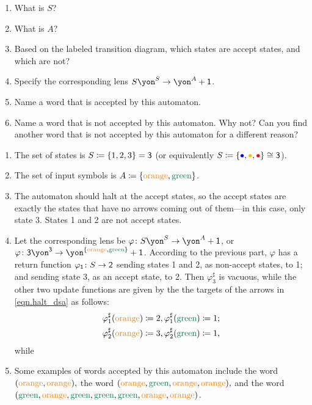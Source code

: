 \documentclass[Book-Poly]{subfiles}
\begin{document}
\begin{exercise}
\begin{enumerate}
	\item What is $S$?
	\item What is $A$?
	\item Based on the labeled transition diagram, which states are accept states, and which are not?
	\item Specify the corresponding lens $S\yon^S\to\yon^A+\1$.
	\item Name a word that is accepted by this automaton.
	\item Name a word that is not accepted by this automaton.
	Why not?
	Can you find another word that is not accepted by this automaton for a different reason?
\qedhere
\end{enumerate}
\begin{solution}
\begin{enumerate}
    \item The set of states is $S\coloneqq\{1,2,3\}=\textsf{3}$ (or equivalently $S\coloneqq\{\bul[blue],\bul[dyellow],\bul[red]\}\iso\3$).
    \item The set of input symbols is $A\coloneqq\{{\color{orange}\text{orange}},{\color{dgreen}\text{green}}\}$.
    \item The automaton should halt at the accept states, so the accept states are exactly the states that have no arrows coming out of them---in this case, only state 3.
    States 1 and 2 are not accept states.
    \item Let the corresponding lens be $\varphi\colon S\yon^S\to\yon^A+\1$, or $\varphi\colon \3\yon^\3\to\yon^{\{{\color{orange}\text{orange}},{\color{dgreen}\text{green}}\}}+\1$.
    According to the previous part, $\varphi$ has a return function $\varphi_{\textsf{1}}\colon S\to\textsf{2}$ sending states 1 and 2, as non-accept states, to 1; and sending state 3, as an accept state, to 2.
    Then $\varphi^\sharp_3$ is vacuous, while the other two update functions are given by the the targets of the arrows in \eqref{eqn.halt_dsa} as follows:
    \begin{align*}
        \varphi^\sharp_1({\color{orange}\text{orange}})\coloneqq2&,\varphi^\sharp_1({\color{dgreen}\text{green}})\coloneqq1;\\
        \varphi^\sharp_2({\color{orange}\text{orange}})\coloneqq3&,\varphi^\sharp_2({\color{dgreen}\text{green}})\coloneqq1,
    \end{align*}
    while
    \item Some examples of words accepted by this automaton include the word $({\color{orange}\text{orange}},{\color{orange}\text{orange}}),$ the word $({\color{orange}\text{orange}},{\color{dgreen}\text{green}},{\color{orange}\text{orange}},{\color{orange}\text{orange}}),$ and the word $({\color{dgreen}\text{green}},{\color{orange}\text{orange}},{\color{dgreen}\text{green}},{\color{dgreen}\text{green}},{\color{dgreen}\text{green}},{\color{orange}\text{orange}},{\color{orange}\text{orange}})$.

\end{enumerate}
\end{solution}
\end{exercise}
\end{document}
